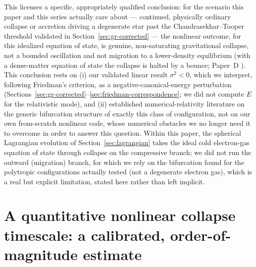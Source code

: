 \documentclass[11pt]{article}
\begin{document}
This licenses a specific, appropriately qualified conclusion: for the scenario this paper and this series actually care about --- continued, physically ordinary collapse or accretion driving a degenerate star past the Chandrasekhar--Tooper threshold validated in Section~\ref{sec:gr-corrected} --- the nonlinear outcome, for this idealized equation of state, is genuine, non-saturating gravitational collapse, not a bounded oscillation and not migration to a lower-density equilibrium (with a dense-matter equation of state the collapse is halted by a bounce; Paper~D \citep{PaperD}). This conclusion rests on (i) our validated linear result $\sigma^2<0$, which we interpret, following Friedman's criterion, as a negative-canonical-energy perturbation (Sections~\ref{sec:gr-corrected}--\ref{sec:friedman-correspondence}; we did not compute $E$ for the relativistic mode), and (ii) established numerical-relativity literature on the generic bifurcation structure of exactly this class of configuration, not on our own from-scratch nonlinear code, whose numerical obstacles \citep{OwnbyPhase2} we no longer need it to overcome in order to answer this question. Within this paper, the spherical Lagrangian evolution of Section~\ref{sec:lagrangian} takes the ideal cold electron-gas equation of state through collapse on the compressive branch; we did not run the outward (migration) branch, for which we rely on the bifurcation found for the polytropic configurations \citep{FontEtAl2002,RadiceRezzollaKellermann2010} actually tested (not a degenerate electron gas), which is a real but explicit limitation, stated here rather than left implicit.

\section{A quantitative nonlinear collapse timescale: a calibrated, order-of-magnitude estimate}
\label{sec:timescale}
\end{document}
